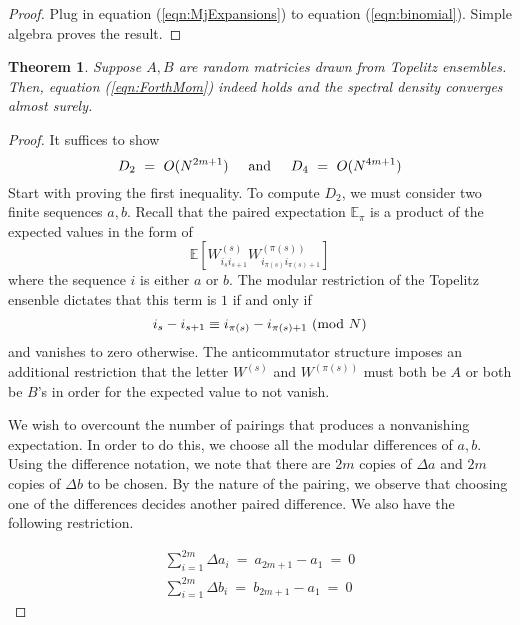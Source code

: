 \documentclass[12pt,reqno]{amsart}
\theoremstyle{plain} %
\newtheorem{theorem}{Theorem}[section]
\theoremstyle{remark}
\theoremstyle{definition}
\newcommand{\E}{\mathbb E}
\renewcommand{\mod}[1]{\textup{ (mod~$#1$)}}
\begin{document}
\begin{proof}
    Plug in equation (\ref{eqn:MjExpansions}) to equation (\ref{eqn:binomial}). 
    Simple algebra proves the result. 
\end{proof}

\begin{theorem}\label{thm:PTPTcvg}
    Suppose $A, B$ are random matricies drawn from Topelitz 
    ensembles. Then, equation (\ref{eqn:ForthMom}) indeed holds and 
    the spectral density converges almost surely. 
\end{theorem}

\begin{proof}
    It suffices to show 
    \begin{equation}
        D_2 \ = \ O(N^{2m + 1})
        { \hspace{5mm} \textrm{and} \hspace{5mm} } 
        D_4 \ = \ O(N^{4m + 1})
    \end{equation}
    Start with proving the first inequality. To compute $D_2$, we must consider 
    two finite sequences $a, b$. 
    Recall that the paired 
    expectation $\E_\pi$ is a product of the expected values in the form of 
    \begin{equation}
        \E[W_{i_si_{s + 1}}^{(s)} W_{i_{\pi(s)}i_{\pi(s) + 1}}^{(\pi(s))}] 
    \end{equation}
    where the sequence $i$ is either $a$ or $b$. 
    The modular restriction of the Topelitz ensenble dictates 
    that this term is $1$ if and only if 
    \begin{equation}
        i_s - i_{s + 1} \equiv i_{\pi(s)} - i_{\pi(s) + 1} \mod N
    \end{equation}
    and vanishes to zero otherwise. The anticommutator structure 
    imposes an additional restriction that the letter $W^{(s)}$ and 
    $W^{(\pi(s))}$ must both be $A$ or both be $B$'s in order for the expected 
    value to not vanish. 

    We wish to overcount the number of pairings that produces 
    a nonvanishing expectation. In order to do this, we choose 
    all the modular differences of $a, b$. Using the difference 
    notation, we note that there are $2m$ copies of $\Delta a$ 
    and $2m$ copies of $\Delta b$ to be chosen. By the nature 
    of the pairing, we observe that choosing one of the 
    differences decides another paired difference. We also have 
    the following restriction. 

    \begin{eqnarray} \label{eqn:ModRestr}
        \sum_{i = 1}^{2m} \Delta a_i \ = \ a_{2m + 1} - a_1 \ =\ 0 \nonumber \\
        \sum_{i = 1}^{2m} \Delta b_i \ = \ b_{2m + 1} - a_1 \ =\ 0 
    \end{eqnarray}


\end{proof}
\end{document}
